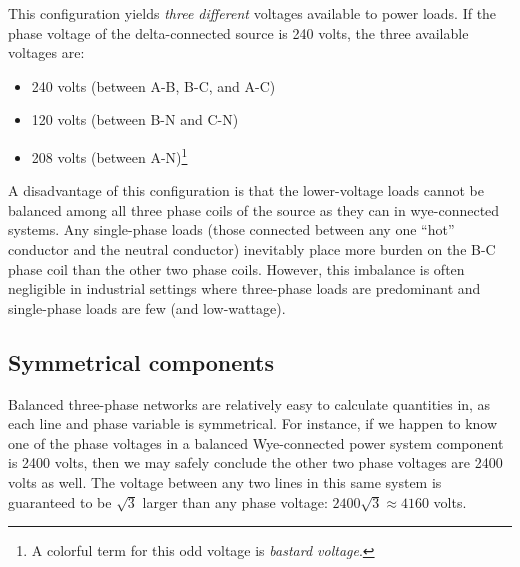 This configuration yields \textit{three different} voltages available to power loads.  If the phase voltage of the delta-connected source is 240 volts, the three available voltages are:

\begin{itemize}
\item 240 volts (between A-B, B-C, and A-C)
\item 120 volts (between B-N and C-N)
\item 208 volts (between A-N)\footnote{A colorful term for this odd voltage is \textit{bastard voltage}.}  
\end{itemize}

A disadvantage of this configuration is that the lower-voltage loads cannot be balanced among all three phase coils of the source as they can in wye-connected systems.  Any single-phase loads (those connected between any one ``hot'' conductor and the neutral conductor) inevitably place more burden on the B-C phase coil than the other two phase coils.  However, this imbalance is often negligible in industrial settings where three-phase loads are predominant and single-phase loads are few (and low-wattage).














\filbreak
\subsection{Symmetrical components}

\label{symmetrical_components}

Balanced three-phase networks are relatively easy to calculate quantities in, as each line and phase variable is symmetrical.  For instance, if we happen to know one of the phase voltages in a balanced Wye-connected power system component is 2400 volts, then we may safely conclude the other two phase voltages are 2400 volts as well.  The voltage between any two lines in this same system is guaranteed to be $\sqrt{3}$ larger than any phase voltage: $2400 \sqrt{3} \approx 4160$ volts.

